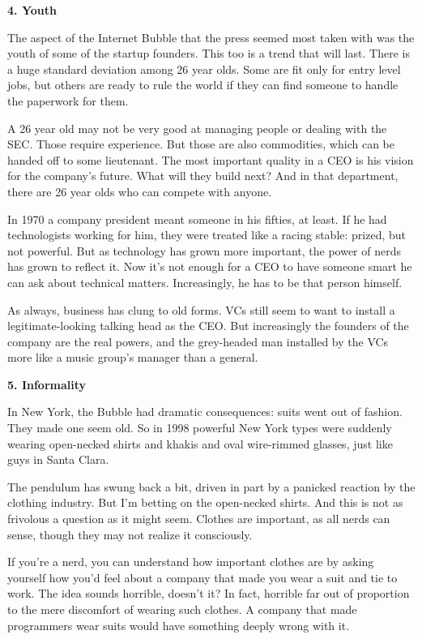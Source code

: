 \textbf{4. Youth}

The aspect of the Internet Bubble that the press seemed most taken with
was the youth of some of the startup founders. This too is a trend that
will last. There is a huge standard deviation among 26 year olds. Some
are fit only for entry level jobs, but others are ready to rule the
world if they can find someone to handle the paperwork for them.

A 26 year old may not be very good at managing people or dealing with
the SEC. Those require experience. But those are also commodities, which
can be handed off to some lieutenant. The most important quality in a
CEO is his vision for the company's future. What will they build next?
And in that department, there are 26 year olds who can compete with
anyone.

In 1970 a company president meant someone in his fifties, at least. If
he had technologists working for him, they were treated like a racing
stable: prized, but not powerful. But as technology has grown more
important, the power of nerds has grown to reflect it. Now it's not
enough for a CEO to have someone smart he can ask about technical
matters. Increasingly, he has to be that person himself.

As always, business has clung to old forms. VCs still seem to want to
install a legitimate-looking talking head as the CEO. But increasingly
the founders of the company are the real powers, and the grey-headed man
installed by the VCs more like a music group's manager than a general.

\textbf{5. Informality}

In New York, the Bubble had dramatic consequences: suits went out of
fashion. They made one seem old. So in 1998 powerful New York types were
suddenly wearing open-necked shirts and khakis and oval wire-rimmed
glasses, just like guys in Santa Clara.

The pendulum has swung back a bit, driven in part by a panicked reaction
by the clothing industry. But I'm betting on the open-necked shirts. And
this is not as frivolous a question as it might seem. Clothes are
important, as all nerds can sense, though they may not realize it
consciously.

If you're a nerd, you can understand how important clothes are by asking
yourself how you'd feel about a company that made you wear a suit and
tie to work. The idea sounds horrible, doesn't it? In fact, horrible far
out of proportion to the mere discomfort of wearing such clothes. A
company that made programmers wear suits would have something deeply
wrong with it.

